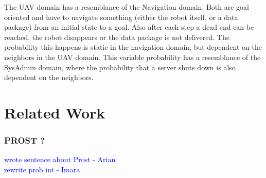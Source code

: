 \documentclass[runningheads,a4paper]{llncs}
\newcommand\todo[1]{\textcolor{blue}{#1}}
\begin{document}
The UAV domain has a resemblance of the Navigation domain. Both are goal
oriented and have to navigate something (either the robot itself, or a data
package) from an initial state to a goal. Also after each step a dead end can
be reached, the robot disappears or the data package is not delivered.
The probability this happens is static in the navigation domain, but dependent
on the neighbors in the UAV domain. This variable probability has a resemblance
of the SysAdmin domain, where the probability that a server shuts down is also
dependent on the neighbors.



\section{Related Work}


\subsubsection{PROST ?}
\todo{wrote sentence about Prost - Arian}\\

\todo{rewrite prob int - Imara}
\end{document}
